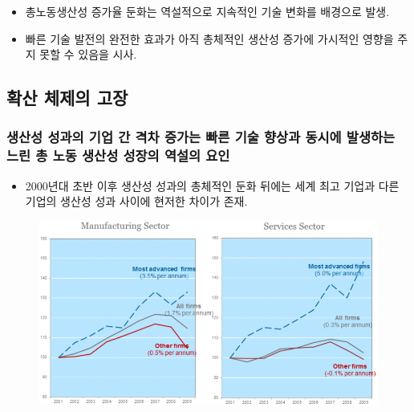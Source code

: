 \documentclass[aspectratio=169,xcolor=dvipsnames,handout]{beamer}
\begin{document}
\begin{frame}{}
    \begin{itemize}
        \item 총노동생산성 증가율 둔화는 역설적으로 지속적인 기술 변화를 배경으로 발생.
        \item 빠른 기술 발전의 완전한 효과가 아직 총체적인 생산성 증가에 가시적인 영향을 주지 못할 수 있음을 시사.
    \end{itemize}
\end{frame}

\subsection{확산 체제의 고장}

\subsubsection{ 생산성 성과의 기업 간 격차 증가는 빠른 기술 향상과 동시에 발생하는 느린 총 노동 생산성 성장의 역설의 요인}


\begin{frame}{}
    \begin{itemize}
        \item 2000년대 초반 이후 생산성 성과의 총체적인 둔화 뒤에는 세계 최고 기업과 다른 기업의 생산성 성과 사이에 현저한 차이가 존재.
    \end{itemize}
    \begin{figure}
        \centering
        \includegraphics[scale=.3]{pic/tpin1.5.png}
        \caption{}
    \end{figure}
\end{frame}
\end{document}
